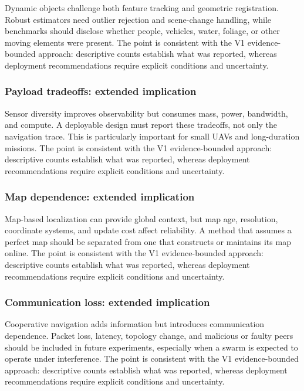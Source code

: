 \documentclass[
  journal,
  10pt]{IEEEtran}
\begin{document}
Dynamic objects challenge both feature tracking and geometric
registration. Robust estimators need outlier rejection and scene-change
handling, while benchmarks should disclose whether people, vehicles,
water, foliage, or other moving elements were present. The point is
consistent with the V1 evidence-bounded approach: descriptive counts
establish what was reported, whereas deployment recommendations require
explicit conditions and uncertainty.

\subsubsection{Payload tradeoffs: extended
implication}\label{payload-tradeoffs-extended-implication}

Sensor diversity improves observability but consumes mass, power,
bandwidth, and compute. A deployable design must report these tradeoffs,
not only the navigation trace. This is particularly important for small
UAVs and long-duration missions. The point is consistent with the V1
evidence-bounded approach: descriptive counts establish what was
reported, whereas deployment recommendations require explicit conditions
and uncertainty.

\subsubsection{Map dependence: extended
implication}\label{map-dependence-extended-implication}

Map-based localization can provide global context, but map age,
resolution, coordinate systems, and update cost affect reliability. A
method that assumes a perfect map should be separated from one that
constructs or maintains its map online. The point is consistent with the
V1 evidence-bounded approach: descriptive counts establish what was
reported, whereas deployment recommendations require explicit conditions
and uncertainty.

\subsubsection{Communication loss: extended
implication}\label{communication-loss-extended-implication}

Cooperative navigation adds information but introduces communication
dependence. Packet loss, latency, topology change, and malicious or
faulty peers should be included in future experiments, especially when a
swarm is expected to operate under interference. The point is consistent
with the V1 evidence-bounded approach: descriptive counts establish what
was reported, whereas deployment recommendations require explicit
conditions and uncertainty.
\end{document}
